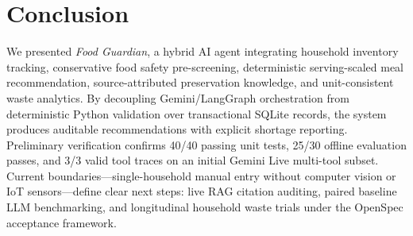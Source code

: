 \section{Conclusion}
\label{sec:conclusion}

We presented \textit{Food Guardian}, a hybrid AI agent integrating household inventory tracking, conservative food safety pre-screening, deterministic serving-scaled meal recommendation, source-attributed preservation knowledge, and unit-consistent waste analytics. By decoupling Gemini/LangGraph orchestration from deterministic Python validation over transactional SQLite records, the system produces auditable recommendations with explicit shortage reporting. Preliminary verification confirms 40/40 passing unit tests, 25/30 offline evaluation passes, and 3/3 valid tool traces on an initial Gemini Live multi-tool subset. Current boundaries---single-household manual entry without computer vision or IoT sensors---define clear next steps: live RAG citation auditing, paired baseline LLM benchmarking, and longitudinal household waste trials under the OpenSpec acceptance framework.
